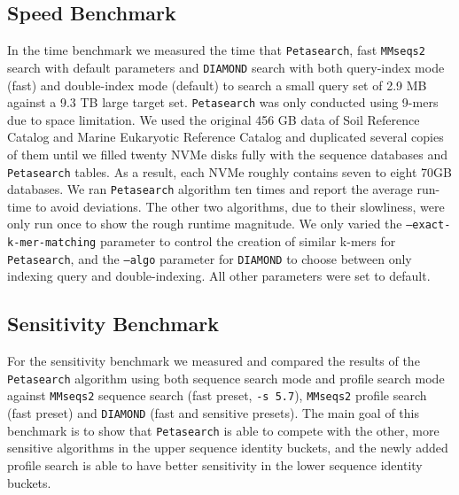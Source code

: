\subsection{Speed Benchmark}

In the time benchmark we measured the time that \texttt{Petasearch}, fast \texttt{MMseqs2} search with default parameters and \texttt{DIAMOND} search with both query-index mode (fast) and double-index mode (default) to search a small query set of 2.9 MB against a 9.3 TB large target set.
\texttt{Petasearch} was only conducted using 9-mers due to space limitation. We used the original 456 GB data of Soil Reference Catalog and Marine Eukaryotic Reference Catalog and duplicated several copies of them until we filled twenty NVMe disks fully with the sequence databases and \texttt{Petasearch} tables. As a result, each NVMe roughly contains seven to eight 70GB databases. We ran \texttt{Petasearch} algorithm ten times and
report the average run-time to avoid deviations. The other two algorithms, due to their slowliness, were only run once to show the rough runtime magnitude. We only varied the \texttt{--exact-k-mer-matching} parameter to control the creation of similar k-mers for \texttt{Petasearch}, and the \texttt{--algo} parameter for \texttt{DIAMOND} to choose between only indexing query and double-indexing. All other parameters were set to default.


\subsection{Sensitivity Benchmark}

For the sensitivity benchmark we measured and compared the results of the \texttt{Petasearch} algorithm using both sequence search mode and profile search mode against \texttt{MMseqs2} sequence search (fast preset, \texttt{-s 5.7}), \texttt{MMseqs2} profile search (fast preset) and \texttt{DIAMOND} (fast and sensitive presets). The main goal of this benchmark is to show that \texttt{Petasearch} is able to compete with the other, more sensitive algorithms in the upper sequence identity buckets, and the newly added profile search is able to have better sensitivity in the lower sequence identity buckets.

